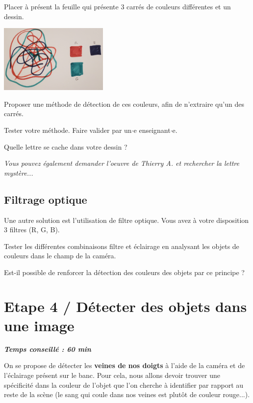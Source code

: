 \documentclass[a4paper,11pt,titlepage]{article} %
\begin{document}
\medskip

\Manip Placer à présent la feuille qui présente 3 carrés de couleurs différentes et un dessin.

\begin{center}
	\includegraphics[width=0.4\textwidth]{images/dessin.jpg}
\end{center}

\Quest Proposer une méthode de détection de ces couleurs, afin de n'extraire qu'un des carrés.

\Manip Tester votre méthode. Faire valider par un$\cdot$e enseignant$\cdot$e.

\Quest Quelle lettre se cache dans votre dessin ? 

\textit{Vous pouvez également demander l'oeuvre de Thierry A. et rechercher la lettre mystère...}

\subsection{Filtrage optique}

Une autre solution est l'utilisation de filtre optique. Vous avez à votre disposition 3 filtres (R, G, B).

\Manip Tester les différentes combinaisons filtre et éclairage en analysant les objets de couleurs dans le champ de la caméra.

\Quest Est-il possible de renforcer la détection des couleurs des objets par ce principe ?

\newpage
\section{Etape 4 / Détecter des objets dans une image}

\begin{center} \textbf{\textit{Temps conseillé : 60 min}} \end{center}

On se propose de détecter les \textbf{veines de nos doigts} à l'aide de la caméra et de l'éclairage présent sur le banc. Pour cela, nous allons devoir trouver une spécificité dans la couleur de l'objet que l'on cherche à identifier par rapport au reste de la scène (le sang qui coule dans nos veines est plutôt de couleur rouge...).
\end{document}
